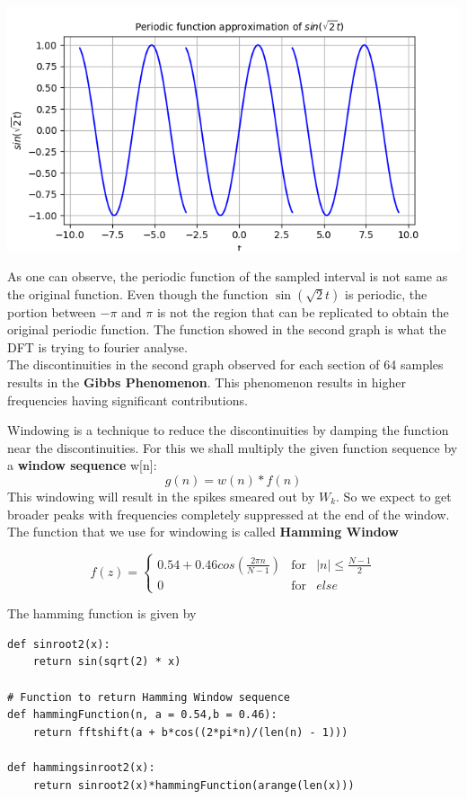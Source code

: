 \documentclass[12pt, a4paper]{report}
\begin{document}
\begin{center}
	\includegraphics[scale=0.75]{Figure_4.png} 
	\label{fig:rawdata}
\end{center}
As one can observe, the periodic function of the sampled interval is not same as the original function. Even though the function $\sin (\sqrt{2}t)$ is periodic, the portion between $-\pi$ and $\pi$ is not the region that can be replicated to obtain the original periodic function. The function showed in the second graph is what the DFT is trying to fourier analyse.
\\

The discontinuities in the second graph observed for each section of 64 samples results in the \textbf{Gibbs Phenomenon}. This phenomenon results in higher frequencies having significant contributions. 

Windowing is a technique to reduce the discontinuities by damping the function near the discontinuities. For this we shall multiply the given function sequence by a \textbf{window sequence} w[n]:
\begin{equation*}
g(n) = w(n)*f(n)
\end{equation*}
This windowing will result in the spikes smeared out by $W_k$. So we expect to get broader peaks with frequencies completely suppressed at the end of the window. The function that we use for windowing is called \textbf{Hamming Window}

\begin{equation*}
f(z) =     \left\{ \begin{array}{rcl} 0.54 + 0.46 cos(\frac{2 \pi n}{N-1}) & \mbox{for}& |n| \leq \frac{N-1}{2} \\ 0  & \mbox{for} & else \end{array}\right.
\end{equation*}

The hamming function is given by
\begin{verbatim}
def sinroot2(x):
    return sin(sqrt(2) * x)

# Function to return Hamming Window sequence
def hammingFunction(n, a = 0.54,b = 0.46):
    return fftshift(a + b*cos((2*pi*n)/(len(n) - 1)))

def hammingsinroot2(x):
    return sinroot2(x)*hammingFunction(arange(len(x)))    
\end{verbatim}
\end{document}

